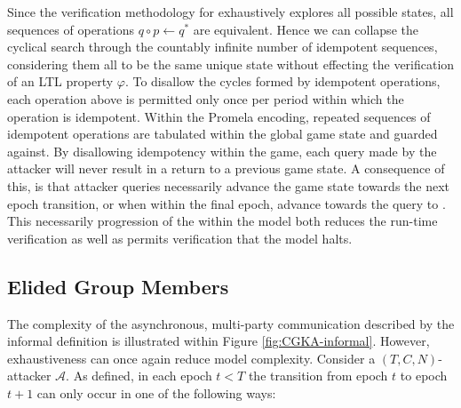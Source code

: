 Since the verification methodology for  exhaustively explores all possible \CGKAsec states, all sequences of operations \(q \circ p \gets q^{*}\) are equivalent.
Hence we can collapse the cyclical search through the countably infinite number of idempotent sequences, considering them all to be the same unique state without effecting the verification of an LTL property \(\varphi\).
To disallow the cycles formed by idempotent operations, each operation above is permitted only once per period within which the operation is idempotent.
Within the \CGKAmod Promela encoding, repeated sequences of idempotent operations are tabulated within the global game state and guarded against.
By disallowing idempotency within the game, each query made by the attacker will never result in a return to a previous game state.
A consequence of this, is that attacker queries necessarily advance the game state towards the next epoch transition, or when within the final epoch, advance towards the query to .
This necessarily progression of the \CGKAsec within the model  both reduces the run-time verification as well as permits verification that the model  halts.


\hypertarget{sec:elided-group-members}{%
\subsection{Elided Group Members}\label{sec:elided-group-members}}

The complexity of the asynchronous, multi-party communication described by the informal \CGKAsec definition is illustrated within Figure \ref{fig:CGKA-informal}.
However, exhaustiveness can once again reduce model complexity.
Consider a \((T, C, N)\)-attacker \(\mathcal{A}\).
As defined, in each epoch $t < T$ the transition from epoch $t$ to epoch $t+1$ can only occur in one of the following ways:

